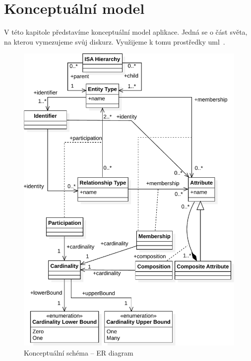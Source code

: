 \section{Konceptuální model}\label{section:conceptual-model}

V této kapitole představíme konceptuální model aplikace.
Jedná se o část světa, na kterou vymezujeme svůj diskurz.
Využijeme k tomu prostředky \acrfull{uml}~\cite{omg_uml_2017}.

\begin{figure}[!htb]
  \centering
  \includegraphics[width=\maxwidth{\textwidth}]{../img/diagrams/er-diagram-model.pdf}
  \caption{Konceptuální schéma -- ER diagram}
  \label{fig:class-diagram:er-diagram}
\end{figure}

